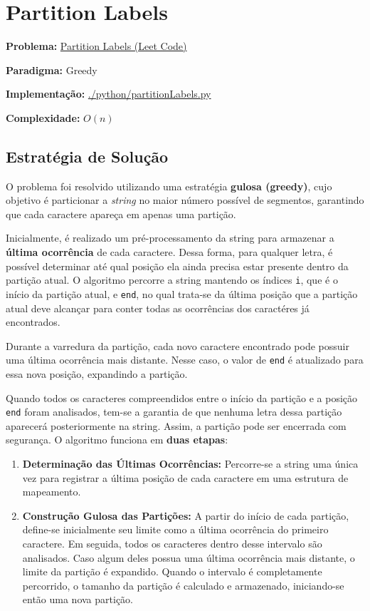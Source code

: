\documentclass[
    12pt,
    oneside,
    a4paper,
    brazil
]{abntex2}
\begin{document}
\chapter{Partition Labels}

\textbf{Problema:} \href{https://leetcode.com/problems/partition-labels/description/}{Partition Labels (Leet Code)}

\textbf{Paradigma:} Greedy

\textbf{Implementação:} \href{https://github.com/BccMaterial/AA-Trabalho/blob/main/python/partitionLabels.py}{./python/partitionLabels.py}

\textbf{Complexidade:} $O(n)$

\section{Estratégia de Solução}

O problema foi resolvido utilizando uma estratégia \textbf{gulosa (greedy)}, cujo objetivo é particionar a \textit{string} no maior número possível de segmentos, garantindo que cada caractere apareça em apenas uma partição.

Inicialmente, é realizado um pré-processamento da string para armazenar a \textbf{última ocorrência} de cada caractere. Dessa forma, para qualquer letra, é possível determinar até qual posição ela ainda precisa estar presente dentro da partição atual. O algoritmo percorre a string mantendo os índices \texttt{i}, que é o início da partição atual, e \texttt{end}, no qual trata-se da última posição que a partição atual deve alcançar para conter todas as ocorrências dos caractéres já encontrados.

Durante a varredura da partição, cada novo caractere encontrado pode possuir uma última ocorrência mais distante. Nesse caso, o valor de \texttt{end} é atualizado para essa nova posição, expandindo a partição.

Quando todos os caracteres compreendidos entre o início da partição e a posição \texttt{end} foram analisados, tem-se a garantia de que nenhuma letra dessa partição aparecerá posteriormente na string. Assim, a partição pode ser encerrada com segurança. O algoritmo funciona em \textbf{duas etapas}:
\begin{enumerate}
	\item{\textbf{Determinação das Últimas Ocorrências:} Percorre-se a string uma única vez para registrar a última posição de cada caractere em uma estrutura de mapeamento.}
	\item{\textbf{Construção Gulosa das Partições:} A partir do início de cada partição, define-se inicialmente seu limite como a última ocorrência do primeiro caractere. Em seguida, todos os caracteres dentro desse intervalo são analisados. Caso algum deles possua uma última ocorrência mais distante, o limite da partição é expandido. Quando o intervalo é completamente percorrido, o tamanho da partição é calculado e armazenado, iniciando-se então uma nova partição.}
\end{enumerate}
\end{document}
